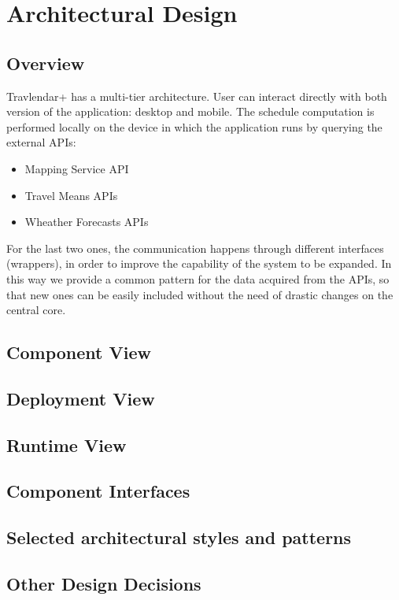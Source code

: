 \chapter{Architectural Design}

\section{Overview}
Travlendar+ has a multi-tier architecture. User can interact  directly with both version of the application: desktop and mobile. The schedule computation is performed locally on the device in which the application runs by querying the external APIs:

\begin{itemize}
\item Mapping Service API
\item Travel Means APIs
\item Wheather Forecasts APIs
\end{itemize}

For the last two ones, the communication happens through different interfaces (wrappers), in order to improve the capability of the system to be expanded. In this way we provide a common pattern for the data acquired from the APIs, so that new ones can be easily included without the need of drastic changes on the central core.

\section{Component View}

\section{Deployment View} 

\section{Runtime View}

\section{Component Interfaces}

\section{Selected architectural styles and patterns}

\section{Other Design Decisions}
